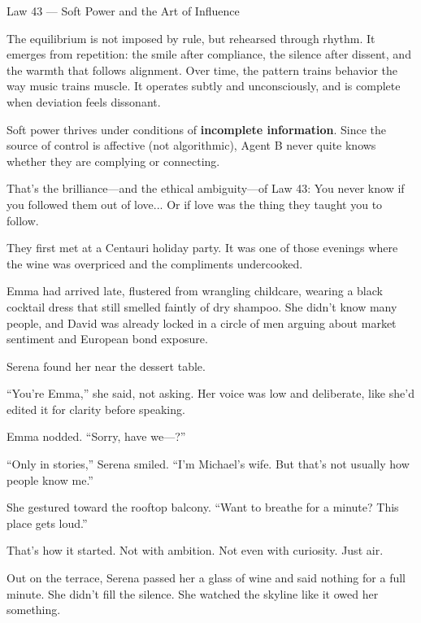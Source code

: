 \begin{PhilosophicalSidebar}{Law 43 --- Soft Power and the Art of Influence}
  \medskip

  The equilibrium is not imposed by rule, but rehearsed through rhythm.  
  It emerges from repetition: the smile after compliance, the silence after dissent, and the warmth that follows 
  alignment.  
  Over time, the pattern trains behavior the way music trains muscle. It operates subtly and unconsciously, 
  and is complete when deviation feels dissonant.
  
  \medskip
  
  Soft power thrives under conditions of \textbf{incomplete information}. Since the source of 
  control is affective (not algorithmic), Agent B never quite knows whether they are complying or connecting.
  
  \medskip
  
  That’s the brilliance—and the ethical ambiguity—of Law 43:
  You never know if you followed them out of love...
  Or if love was the thing they taught you to follow.
  
\end{PhilosophicalSidebar}

\medskip

They first met at a Centauri holiday party. It was one of those evenings where the wine was overpriced and 
the compliments undercooked.

Emma had arrived late, flustered from wrangling childcare, wearing a black cocktail dress that still 
smelled faintly of dry shampoo. She didn’t know many people, and David was already locked in a circle of 
men arguing about market sentiment and European bond exposure.

Serena found her near the dessert table.

``You’re Emma,'' she said, not asking. Her voice was low and deliberate, like she’d edited it for 
clarity before speaking.

Emma nodded. ``Sorry, have we—?''

``Only in stories,'' Serena smiled. ``I’m Michael’s wife. But that’s not usually how people know me.''

She gestured toward the rooftop balcony. ``Want to breathe for a minute? This place gets loud.''

That’s how it started. Not with ambition. Not even with curiosity. Just air.

Out on the terrace, Serena passed her a glass of wine and said nothing for a full minute. She didn’t 
fill the silence. She watched the skyline like it owed her something.

